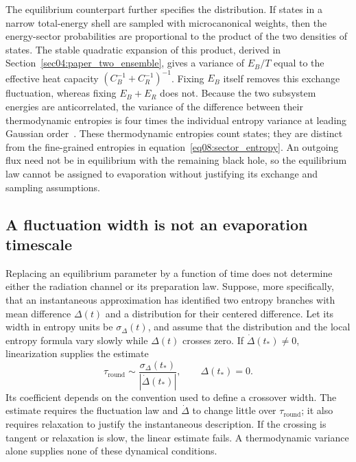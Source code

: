 \documentclass[11pt,letterpaper]{article}
\theoremstyle{plain}
\theoremstyle{definition}
\theoremstyle{remark}
\begin{document}
The equilibrium counterpart further specifies the distribution. If
states in a narrow total-energy shell are sampled with microcanonical
weights, then the energy-sector probabilities are proportional to the
product of the two densities of states. The stable quadratic expansion
of this product, derived in Section~\ref{sec04:paper_two_ensemble},
gives a variance of $E_B/T$ equal to the effective heat capacity
$(C_B^{-1}+C_R^{-1})^{-1}$. Fixing $E_B$ itself removes this exchange
fluctuation, whereas fixing $E_B+E_R$ does not. Because the two
subsystem energies are anticorrelated, the variance of the difference
between their thermodynamic entropies is four times the individual
entropy variance at leading Gaussian order~\citep{wuebben2026b}.
These thermodynamic entropies count states; they are distinct from
the fine-grained entropies in equation~\eqref{eq08:sector_entropy}.
An outgoing flux need not be in equilibrium with the remaining black
hole, so the equilibrium law cannot be assigned to evaporation without
justifying its exchange and sampling assumptions.

\subsection{A fluctuation width is not an evaporation timescale}
\label{subsec08:instantaneous_approximation}

Replacing an equilibrium parameter by a function of time does not
determine either the radiation channel or its preparation law.
Suppose, more specifically, that an instantaneous approximation has
identified two entropy branches with mean difference $\Delta(t)$ and
a distribution for their centered difference. Let its width in entropy
units be $\sigma_\Delta(t)$, and assume that the distribution and the
local entropy formula vary slowly while $\Delta(t)$ crosses zero.
If $\dot\Delta(t_*)\ne0$, linearization supplies the estimate
\begin{equation}
 \tau_{\mathrm{round}}\sim
 \frac{\sigma_\Delta(t_*)}{|\dot\Delta(t_*)|},
 \qquad \Delta(t_*)=0.
 \label{eq08:time_width}
\end{equation}
Its coefficient depends on the convention used to define a crossover
width. The estimate requires the fluctuation law and
$\dot\Delta$ to change little over $\tau_{\mathrm{round}}$; it also
requires relaxation to justify the instantaneous description. If the
crossing is tangent or relaxation is slow, the linear estimate fails.
A thermodynamic variance alone supplies none of these dynamical
conditions.
\end{document}
